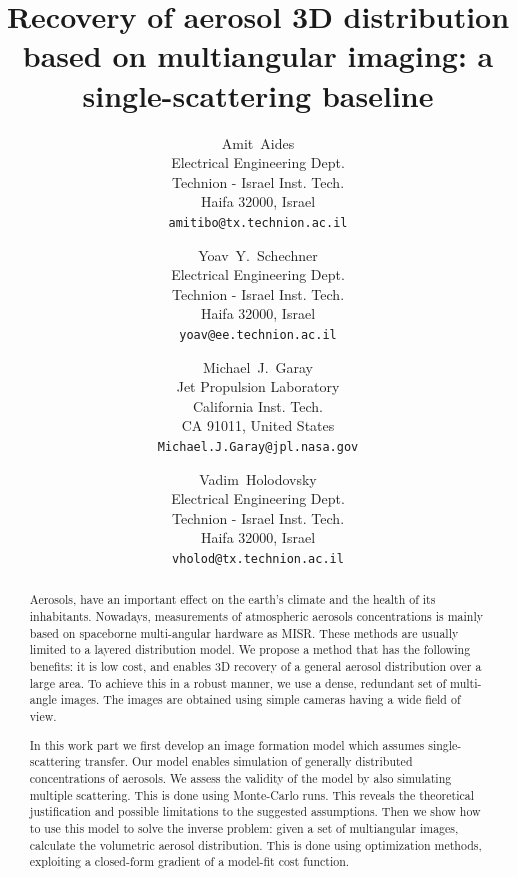 \documentclass[10pt,twocolumn,letterpaper]{article}
\begin{document}
\title{Recovery of aerosol 3D distribution based on multiangular imaging: a single-scattering baseline}

\author{Amit~Aides\\
Electrical Engineering Dept.\\
Technion - Israel Inst. Tech.\\
Haifa 32000, Israel\\
{\tt\small amitibo@tx.technion.ac.il}
\and 
Yoav~Y.~Schechner\\
Electrical Engineering Dept.\\
Technion - Israel Inst. Tech.\\
Haifa 32000, Israel\\
{\tt\small yoav@ee.technion.ac.il}
\and 
Michael~J.~Garay\\
Jet Propulsion Laboratory\\
California Inst. Tech.\\
CA 91011, United States\\
{\tt\small Michael.J.Garay@jpl.nasa.gov}
\and 
Vadim~Holodovsky\\
Electrical Engineering Dept.\\
Technion - Israel Inst. Tech.\\
Haifa 32000, Israel\\
{\tt\small vholod@tx.technion.ac.il}
}

\maketitle
\thispagestyle{empty}

\begin{abstract}
  Aerosols, have an important effect on the earth's climate and the
  health of its inhabitants. Nowadays, measurements of atmospheric
  aerosols concentrations is mainly based on spaceborne multi-angular
  hardware as MISR. These methods are usually limited to a layered
  distribution model. We propose a method that has the following
  benefits: it is low cost, and enables 3D recovery of a general
  aerosol distribution over a large area.  To achieve this in a robust
  manner, we use a dense, redundant set of multi-angle images. The
  images are obtained using simple cameras having a wide field of
  view.

  In this work part we first develop an image formation model which
  assumes single-scattering transfer.  Our model enables simulation of
  generally distributed concentrations of aerosols.  We assess the
  validity of the model by also simulating multiple scattering. This
  is done using Monte-Carlo runs.  This reveals the theoretical
  justification and possible limitations to the suggested assumptions.
  Then we show how to use this model to solve the inverse problem:
  given a set of multiangular images, calculate the volumetric aerosol
  distribution.  This is done using optimization methods, exploiting a
  closed-form gradient of a model-fit cost function.
\end{abstract}
\end{document}
